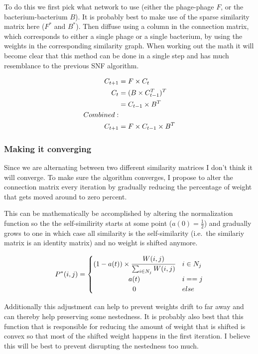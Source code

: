 \documentclass{article}
\begin{document}
To do this we first pick what network to use (either the phage-phage $F$, or 
the bacterium-bacterium $B$). It is probably best to make use of the sparse
similarity matrix here ($F^*$ and $B^*$). 
Then diffuse using a column in the connection matrix,
which corresponds to either a single phage or a single bacterium, by 
using the weights in the corresponding similarity graph. When working out 
the math it will become clear that this method can be done in a single 
step and has much resemblance to the previous SNF algorithm. 

\begin{align}
    \begin{split}
    C_{t+1} &= F \times C_t \\
    C_{t} &= (B \times C_{t - 1}^{T})^{T} \\
          &= C_{t - 1} \times B^T \\
    \hfil Combined: \\
    C_{t+1} &= F \times C_{t - 1} \times B^T
    \end{split}
\end{align}

\subsubsection{Making it converging}

Since we are alternating between two different similarity matrices I don't think it will
converge. To make sure the algorithm converges, I propose to alter the
connection matrix every iteration by gradually reducing the percentage of weight
that gets moved around to zero percent.

This can be mathematically be accomplished by altering the normalization
function so the the self-similirity starts at some point ($a(0) = \frac{1}{2}$) and gradually 
grows to one in which case all similarity is the self-similarity 
(i.e.\ the similariy matrix is an identity matrix)
and no weight is shifted anymore.

\begin{equation}
    P^*(i, j) = 
    \begin{cases}
        (1 - a(t)) \times \cfrac{W(i, j)}{\sum_{i \in N_j}W(i, j)} & i \in N_j \\
        \hfil a(t) & i == j \\
        \hfil 0 & else
    \end{cases}
\end{equation}

Additionally this adjustment can help to prevent weights drift to far away and
can thereby help preserving some nestedness. It is probably also best
that this function that is responsible for reducing the amount of weight
that is shifted is convex so that most of the shifted weight happens in the
first iteration. I believe this will be best to prevent disrupting the 
nestedness too much.
\end{document}
